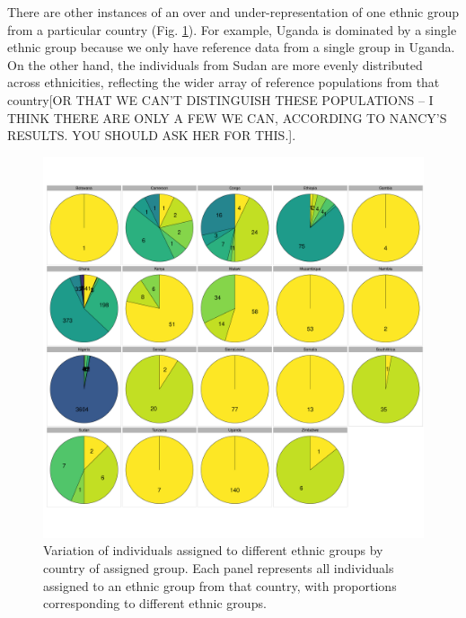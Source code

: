 There are other instances of an over and under-representation of one ethnic group from a particular country (Fig. \ref{fig:all_countries_SF_props_pie_chart}). For example, Uganda is dominated by a single ethnic group because we only have reference data from a single group in Uganda. On the other hand, the individuals from Sudan are more evenly distributed across ethnicities, {\color{red}reflecting the wider array of reference populations from that country[OR THAT WE CAN'T DISTINGUISH THESE POPULATIONS -- I THINK THERE ARE ONLY A FEW WE CAN, ACCORDING TO NANCY'S RESULTS. YOU SHOULD ASK HER FOR THIS.]}. 

\begin{figure}[htp]
    \centering
    \includegraphics[width=1.0\textwidth]{../images/chapter3/all_countries_SF_props_pie_chart.pdf}
    \caption{Variation of individuals assigned to different ethnic groups by country of assigned group. Each panel represents all individuals assigned to an ethnic group from that country, with proportions corresponding to different ethnic groups.}
    \label{fig:all_countries_SF_props_pie_chart}
\end{figure}

